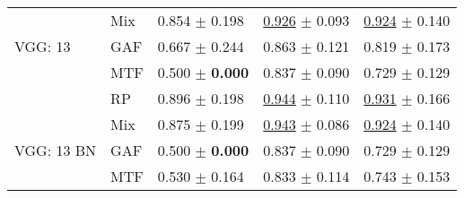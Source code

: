 \begin{tabular}{lllll}
 & Mix & \textcolor[rgb]{0.1175422974,0.5000000000,0}{0.854} $\pm$ \textcolor[rgb]{0.7578007605,0.2421992395,0}{0.198} & \underline{\textcolor[rgb]{0.1707317073,0.5000000000,0}{0.926}} $\pm$ \textcolor[rgb]{0.2602523331,0.5000000000,0}{0.093} & \underline{\textcolor[rgb]{0.1794871795,0.5000000000,0}{0.924}} $\pm$ \textcolor[rgb]{0.2698456329,0.5000000000,0}{0.140} \\
VGG: 13 & GAF & \textcolor[rgb]{0.5583259127,0.4416740873,0}{0.667} $\pm$ \textcolor[rgb]{0.9341807785,0.0658192215,0}{0.244} & \textcolor[rgb]{0.4918699187,0.5000000000,0}{0.863} $\pm$ \textcolor[rgb]{0.4337722642,0.5000000000,0}{0.121} & \textcolor[rgb]{0.5641025641,0.4358974359,0}{0.819} $\pm$ \textcolor[rgb]{0.4793875881,0.5000000000,0}{0.173} \\
 & MTF & \textcolor[rgb]{0.9501335708,0.0498664292,0}{0.500} $\pm$ \textbf{\textcolor[rgb]{0.0000000000,0.5000000000,0}{0.000}} & \textcolor[rgb]{0.6260162602,0.3739837398,0}{0.837} $\pm$ \textcolor[rgb]{0.2377009274,0.5000000000,0}{0.090} & \textcolor[rgb]{0.8974358974,0.1025641026,0}{0.729} $\pm$ \textcolor[rgb]{0.2017357855,0.5000000000,0}{0.129} \\
 & RP & \textcolor[rgb]{0.0195903829,0.5000000000,0}{0.896} $\pm$ \textcolor[rgb]{0.7578007605,0.2421992395,0}{0.198} & \underline{\textcolor[rgb]{0.0813008130,0.5000000000,0}{0.944}} $\pm$ \textcolor[rgb]{0.3672244725,0.5000000000,0}{0.110} & \underline{\textcolor[rgb]{0.1538461538,0.5000000000,0}{0.931}} $\pm$ \textcolor[rgb]{0.4332280526,0.5000000000,0}{0.166} \\
 & Mix & \textcolor[rgb]{0.0685663402,0.5000000000,0}{0.875} $\pm$ \textcolor[rgb]{0.7623521573,0.2376478427,0}{0.199} & \underline{\textcolor[rgb]{0.0853658537,0.5000000000,0}{0.943}} $\pm$ \textcolor[rgb]{0.2161475738,0.5000000000,0}{0.086} & \underline{\textcolor[rgb]{0.1794871795,0.5000000000,0}{0.924}} $\pm$ \textcolor[rgb]{0.2698456329,0.5000000000,0}{0.140} \\
VGG: 13 BN & GAF & \textcolor[rgb]{0.9501335708,0.0498664292,0}{0.500} $\pm$ \textbf{\textcolor[rgb]{0.0000000000,0.5000000000,0}{0.000}} & \textcolor[rgb]{0.6260162602,0.3739837398,0}{0.837} $\pm$ \textcolor[rgb]{0.2377009274,0.5000000000,0}{0.090} & \textcolor[rgb]{0.8974358974,0.1025641026,0}{0.729} $\pm$ \textcolor[rgb]{0.2017357855,0.5000000000,0}{0.129} \\
 & MTF & \textcolor[rgb]{0.8788958148,0.1211041852,0}{0.530} $\pm$ \textcolor[rgb]{0.6254149914,0.3745850086,0}{0.164} & \textcolor[rgb]{0.6463414634,0.3536585366,0}{0.833} $\pm$ \textcolor[rgb]{0.3913485406,0.5000000000,0}{0.114} & \textcolor[rgb]{0.8461538462,0.1538461538,0}{0.743} $\pm$ \textcolor[rgb]{0.3502477607,0.5000000000,0}{0.153} \\

\end{tabular}
